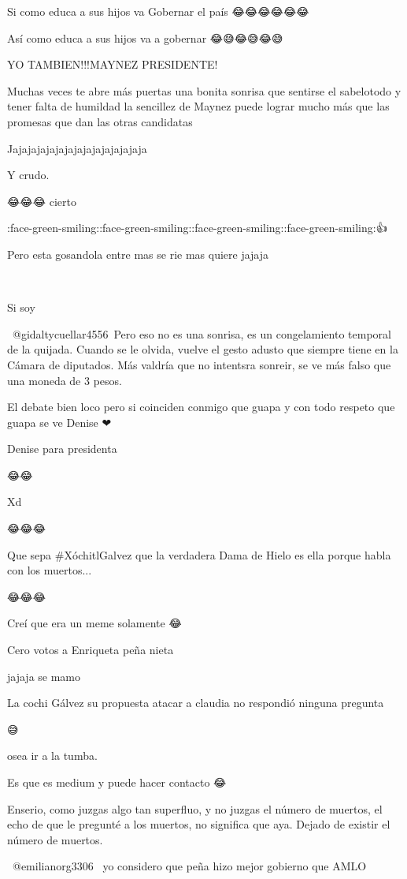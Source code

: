 Si como educa a sus  hijos  va Gobernar el país  😂😂😂😂😂😂

Así como educa a sus hijos  va a gobernar 😂😅😂😅😂😅

YO TAMBIEN!!!MAYNEZ PRESIDENTE!

Muchas veces te abre más puertas una bonita sonrisa que sentirse el sabelotodo y tener falta de humildad la sencillez de Maynez puede lograr mucho más que las promesas que dan las otras candidatas

Jajajajajajajajajajajajajajaja

Y crudo.

😂😂😂 cierto

:face-green-smiling::face-green-smiling::face-green-smiling::face-green-smiling:👍

Pero esta gosandola entre mas se rie mas quiere jajaja

🤣😂🤣😂

Si soy

​ @gidaltycuellar4556 Pero eso no es una sonrisa, es un congelamiento temporal de la quijada. Cuando se le olvida, vuelve el gesto adusto que siempre tiene en la Cámara de diputados. Más valdría que no intentsra sonreir, se ve más falso que una moneda de 3 pesos.

El debate bien loco pero si coinciden conmigo que guapa  y con  todo respeto que guapa se ve Denise ❤

Denise para presidenta🙏🏻

😂😂

Xd

😂😂😂

Que sepa #XóchitlGalvez que la verdadera Dama de Hielo es ella porque habla con los muertos... 🥶💀

😂😂😂

Creí que era un meme solamente 😂

Cero votos a Enriqueta peña nieta

jajaja se mamo

La cochi Gálvez su propuesta atacar a claudia no respondió ninguna pregunta

😅

osea ir a la tumba.

Es que es medium y puede hacer contacto 😂

Enserio, como juzgas algo tan superfluo, y no juzgas el número de muertos, el echo de que le pregunté a los muertos, no significa que aya. Dejado de existir el número de muertos.

 @emilianorg3306  yo considero que peña hizo mejor gobierno que AMLO

